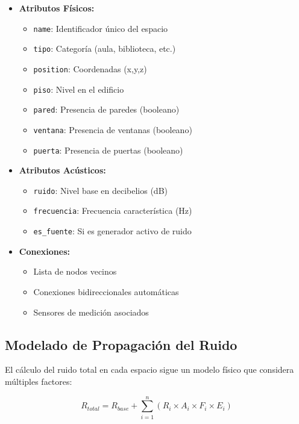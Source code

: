 \documentclass[a4paper,12pt]{article}
\begin{document}
\begin{itemize}
    \item \textbf{Atributos Físicos:}
    \begin{itemize}
        \item \texttt{name}: Identificador único del espacio
        \item \texttt{tipo}: Categoría (aula, biblioteca, etc.)
        \item \texttt{position}: Coordenadas (x,y,z)
        \item \texttt{piso}: Nivel en el edificio
        \item \texttt{pared}: Presencia de paredes (booleano)
        \item \texttt{ventana}: Presencia de ventanas (booleano)
        \item \texttt{puerta}: Presencia de puertas (booleano)
    \end{itemize}

    \item \textbf{Atributos Acústicos:}
    \begin{itemize}
        \item \texttt{ruido}: Nivel base en decibelios (dB)
        \item \texttt{frecuencia}: Frecuencia característica (Hz)
        \item \texttt{es\_fuente}: Si es generador activo de ruido
    \end{itemize}

    \item \textbf{Conexiones:}
    \begin{itemize}
        \item Lista de nodos vecinos
        \item Conexiones bidireccionales automáticas
        \item Sensores de medición asociados
    \end{itemize}
\end{itemize}

\subsection{Modelado de Propagación del Ruido}
El cálculo del ruido total en cada espacio sigue un modelo físico que considera múltiples factores:

\begin{equation}
R_{total} = R_{base} + \sum_{i=1}^{n} (R_i \times A_i \times F_i \times E_i)
\end{equation}
\end{document}

